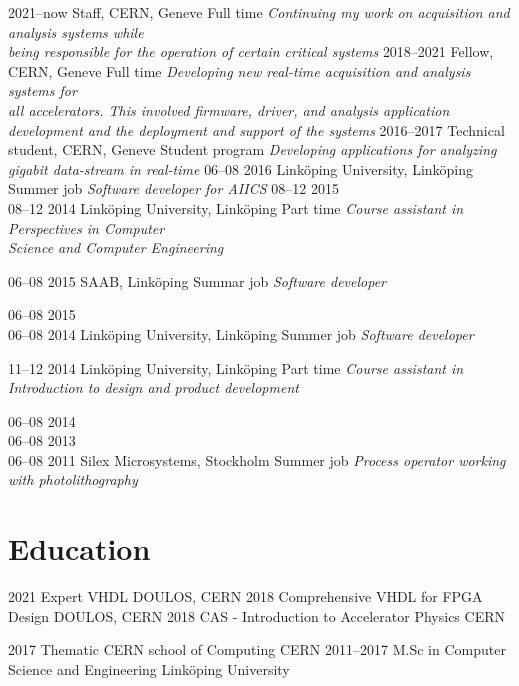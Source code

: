 \documentclass[]{cv-style}          %
\begin{document}
\begin{entrylist}
    \entry
    {2021–now}
    {Staff, CERN, Geneve}
    {Full time}
    {\emph{Continuing my work on acquisition and analysis systems while \\ being responsible for the operation of certain critical systems }}
         \entry
    {2018–2021}
    {Fellow, CERN, Geneve}
    {Full time}
    {\emph{Developing new real-time acquisition and analysis systems for\\ all accelerators. This involved firmware, driver, and analysis application\\ development and the deployment and support of the systems}}
         \entry
    {2016–2017}
    {Technical student, CERN, Geneve}
    {Student program}
    {\emph{Developing applications for analyzing gigabit data-stream in real-time }}
         \entry
    {06–08 2016}
    {Linköping University, Linköping}
    {Summer job}
    {\emph{Software developer for AIICS}}
         \entry
    {08–12 2015\\08–12 2014}
    {Linköping University, Linköping}
    {Part time}
    {\emph{Course assistant in Perspectives in Computer\\ Science and Computer Engineering}}
  
  \entry
    {06–08 2015}
    {SAAB, Linköping}
    {Summar job}
    {\emph{Software developer}}
    
   \entry
    {06–08 2015\\06–08 2014 }
    {Linköping University, Linköping}
    {Summer job}
    {\emph{Software developer}}
   
       \entry
    {11–12 2014}
    {Linköping University, Linköping}
    {Part time}
    {\emph{Course assistant in Introduction to design and product development}}

    
  \entry
    {06–08 2014\\06–08 2013\\06–08 2011 }
    {Silex Microsystems, Stockholm}
    {Summer job}
    {\emph{Process operator working with photolithography}}
    

\end{entrylist}

\section{Education}

\begin{entrylist}
  \entry
    {2021}
    {Expert VHDL}
    {DOULOS, CERN}
    { }
  \entry
    {2018}
    {Comprehensive VHDL for FPGA Design}
    {DOULOS, CERN}
    { }
  \entry
    {2018}
    {CAS - Introduction to Accelerator Physics}
    {CERN}
    { }
        \end{entrylist}
    \begin{entrylist}
    
  \entry
    {2017}
    {Thematic CERN school of Computing}
    {CERN}
    { }
  \entry 
    {2011–2017}
    {M.Sc in Computer Science and Engineering}
    {Linköping University} 
    { }
\end{entrylist}
\end{document}
